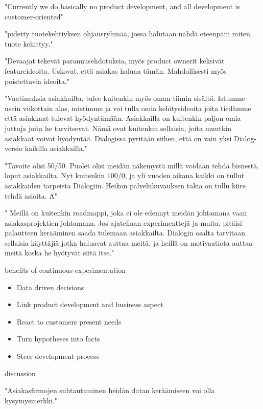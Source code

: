\documentclass[english]{tktltiki2}
\theoremstyle{definition}
\theoremstyle{remark}
\begin{document}
"Currently we do basically no product development, and all development is customer-oriented"

"pidetty tuotekehtiyksen ohjausryhmää, jossa halutaan nähdä eteenpäin miten tuote kehittyy."

"Devaajat tekevät parannusehdotuksia, myös product ownerit keksivät featureideoita. Uskovat, että asiakas haluaa tämän. Mahdollisesti myös poistettavia ideoita."

"Vaatimuksia asiakkailta, tulee kuitenkin myös oman tiimin sisältä. Istumme usein viikottain alas, mietimme ja voi tulla omia kehitysideoita joita tiedämme että asiakkaat tulevat hyödyntämään. Asiakkailla on kuitenkin paljon omia juttuja joita he tarvitsevat. Nämä ovat kuitenkin sellaisia, joita muutkin asiakkaat voivat hyödyntää. Dialogissa pyritään siihen, että on vain yksi Dialog-versio kaikilla asiakkailla."

"Tavoite olisi 50/50. Puolet olisi meidän näkemystä millä voidaan tehdä bisnestä, loput asiakkailta. Nyt kuitenkin 100/0, ja yli vuoden aikana kaikki on tullut asiakkaiden tarpeista Dialogiin. Heikon palvelukuvauksen takia on tullu kiire tehdä asioita. A"

" Meillä on kuitenkin roadmappi, joka ei ole edennyt meidän johtamana vaan asiakasprojektien johtamana. Jos ajatellaan experimenttejä ja muita, pitäisi palautteen kerääminen saada tulemaan asiakkailta.  Dialogin osalta tarvitaan sellaisia käyttäjiä jotka haluavat auttaa meitä, ja heillä on motivaatiota auttaa meitä koska he hyötyvät siitä itse."


benefits of continuous experimentation

\begin{itemize}
\item  Data driven decisions
\item  Link product development and business aspect
\item  React to customers present needs
\item  Turn hypotheses into facts
\item  Steer development process
\end{itemize}

discussion


"Asiakasfirmojen suhtautuminen heidän datan keräämiseen voi olla kysymysmerkki."

\end{document}
